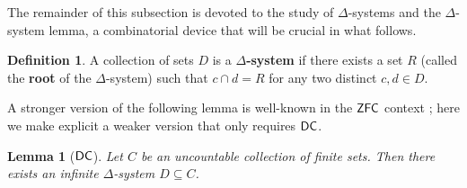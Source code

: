 \documentclass{amsart}
\newtheorem{lemma}[theorem]{Lemma}
\theoremstyle{definition}
\newtheorem{definition}[theorem]{Definition}
\newcommand{\dc}{\mathnormal{\mathsf{DC}}}
\newcommand{\zfc}{\mathnormal{\mathsf{ZFC}}}
\theoremstyle{remark}
\newtheorem{remark}[theorem]{Remark}
\numberwithin{equation}{section}
\begin{document}




The remainder of this subsection is devoted to the study of $\Delta$-systems and the $\Delta$-system lemma, a combinatorial device that will be crucial in what follows.
    
\begin{definition}\label{def:delta-system}
A collection of sets $D$ is a {\bf $\Delta$-system} if there exists a set $R$ (called the {\bf root} of the $\Delta$-system) such that $c\cap d=R$ for any two distinct $c,d\in D$.
\end{definition}

A stronger version of the following lemma is well-known in the $\zfc$ context \cite{ErdosRado1960}; here we make explicit a weaker version that only requires $\dc$.


\begin{lemma}[$\dc$]\label{lem:delta-system-dc}
Let $C$ be an uncountable collection of finite sets. Then there exists an infinite $\Delta$-system $D\subseteq C$.
\end{lemma}
\end{document}
